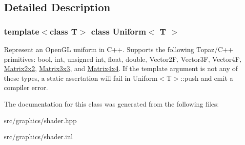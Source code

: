 \subsection{Detailed Description}
\subsubsection*{template$<$class T$>$\newline
class Uniform$<$ T $>$}

Represent an Open\+GL uniform in C++. Supports the following Topaz/\+C++ primitives\+: bool, int, unsigned int, float, double, Vector2F, Vector3F, Vector4F, \mbox{\hyperlink{class_matrix2x2}{Matrix2x2}}, \mbox{\hyperlink{class_matrix3x3}{Matrix3x3}}, and \mbox{\hyperlink{class_matrix4x4}{Matrix4x4}}. If the template argument is not any of these types, a static assertation will fail in Uniform$<$\+T$>$\+::push and emit a compiler error. 

The documentation for this class was generated from the following files\+:\begin{DoxyCompactItemize}
\item 
src/graphics/shader.\+hpp\item 
src/graphics/shader.\+inl\end{DoxyCompactItemize}

